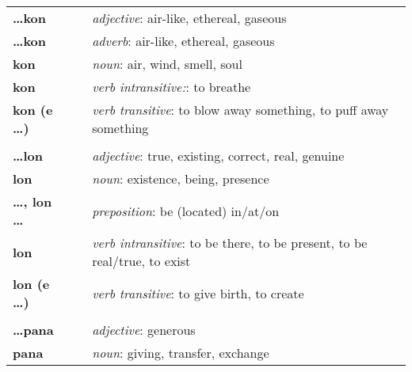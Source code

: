 \begin{supertabular}{p{2,5cm}|ll}
    \textbf{\dots kon}             &  & \textit{adjective}: air-like, ethereal, gaseous                                             \\ %
    \textbf{\dots kon}             &  & \textit{adverb}: air-like, ethereal, gaseous                                                \\ %
    \textbf{kon}                   &  & \textit{noun}: air, wind, smell, soul                                                       \\ %
    \textbf{kon}                   &  & \textit{verb intransitive:}: to breathe                                                     \\ %
    \textbf{kon (e \dots)}         &  & \textit{verb transitive}: to blow away something, to puff away something                    \\ %
                                   &  &                                                                                             \\ %
    \textbf{\dots lon}             &  & \textit{adjective}: true, existing, correct, real, genuine                                  \\ %
    \textbf{lon}                   &  & \textit{noun}: existence, being, presence                                                   \\ %
    \textbf{\dots , lon \dots}     &  & \textit{preposition}: be (located) in/at/on                                                 \\ %
    \textbf{lon}                   &  & \textit{verb intransitive}: to be there, to be present, to be real/true, to exist           \\ %
    \textbf{lon (e \dots)}         &  & \textit{verb transitive}: to give birth, to create                                          \\ %
                                   &  &                                                                                             \\ %
    \textbf{\dots pana}            &  & \textit{adjective}: generous                                                                \\ %
    \textbf{pana}                  &  & \textit{noun}: giving, transfer, exchange                                                   \\ %

\end{supertabular}
